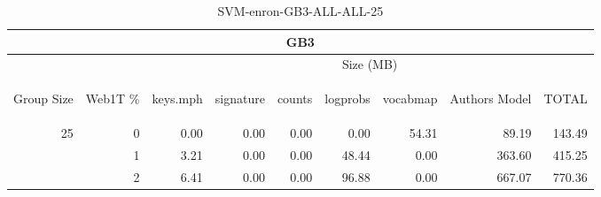 \begin{center}
\begin{table}[htbp] 
 \begin{center}
\begin{tabular}{ | r | r | r | r | r | r | r | r | r |}
\hline
\multicolumn{9}{|c|}{GB3}\\
\hline
 & & \multicolumn{7}{|c|}{Size (MB)}\\ \cline{3-9}
\begin{sideways}Group Size\end{sideways} & \begin{sideways}Web1T \% \end{sideways} & \begin{sideways}keys.mph\end{sideways} & \begin{sideways}signature\end{sideways} & \begin{sideways}counts\end{sideways} & \begin{sideways}logprobs\end{sideways} & \begin{sideways}vocabmap\end{sideways} & \begin{sideways}Authors Model \end{sideways} & \begin{sideways}TOTAL\end{sideways}\\
\hline
\multirow{2}{*}{25}
 & 0 & 0.00 & 0.00 & 0.00 & 0.00 & 54.31 & 89.19 & 143.49\\ \cline{2-9}
 & 1 & 3.21 & 0.00 & 0.00 & 48.44 & 0.00 & 363.60 & 415.25\\ \cline{2-9}
 & 2 & 6.41 & 0.00 & 0.00 & 96.88 & 0.00 & 667.07 & 770.36\\ \cline{2-9}
\hline
\end{tabular}
\caption{SVM-enron-GB3-ALL-ALL-25}
\label{table:SVM-enron-GB3-ALL-ALL-25}
\end{center}
 \end{table}
\end{center}


